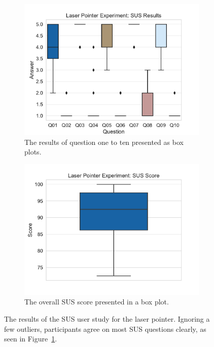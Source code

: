 \begin{figure}[H]
	\centering
	\begin{subfigure}[t]{.48\linewidth}%
		\centering
		\includegraphics[width=\linewidth]{figures/evaluation/res_exp_lp.pdf}
    \caption{The results of question one to ten presented as box plots.}\label{fig:res-exp-lp}
	\end{subfigure}%
	\hspace{0.04\linewidth}%
	\begin{subfigure}[t]{.48\linewidth}%
		\centering
		\includegraphics[width=\linewidth]{figures/evaluation/score_exp_lp.pdf}
		\caption{The overall \gls{SUS} score presented in a box plot.}\label{fig:score-exp-lp}
	\end{subfigure}%
	\caption[Laser pointer SUS results]{The results of the \gls{SUS} user study for the laser pointer. Ignoring a few outliers, participants agree on most \gls{SUS} questions clearly, as seen in Figure~\ref{fig:res-exp-lp}.}\label{fig:exp-lp-stats}
\end{figure}

